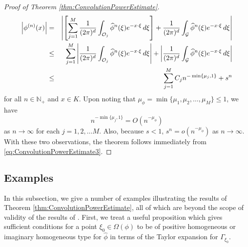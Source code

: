 \documentclass[11pt]{article}
\theoremstyle{remark}
\newcommand{\lb}{\left[}
\newcommand{\rb}{\right]}
\begin{document}
\begin{proof}[Proof of Theorem \ref{thm:ConvolutionPowerEstimate}]
\begin{eqnarray}\label{eq:ConvolutionPowerEstimate3}\nonumber
    \abs{\phi^{(n)}(x)}
    &=&\abs{\lb \sum_{j=1}^M\frac{1}{(2\pi)^d}\int_{\mathcal{O}_j}\widehat{\phi}^n(\xi)e^{-x\cdot\xi}\,d\xi \rb
    +\frac{1}{(2\pi)^d}\int_{\mathcal{G}}\widehat{\phi}^n(\xi)e^{-x\cdot\xi}\,d\xi}\\\nonumber
    &\leq&\sum_{j=1}^M\abs{\frac{1}{(2\pi)^d}\int_{\mathcal{O}_j}\widehat{\phi}^n(\xi)e^{-x\cdot\xi}\,d\xi}+\abs{\frac{1}{(2\pi)^d}\int_{\mathcal{G}}\widehat{\phi}^n(\xi)e^{-x\cdot\xi}\,d\xi}\\
    &\leq&\sum_{j=1}^M C_jn^{-\min\{\mu_j,1\}}+s^n
\end{eqnarray}
for all $n\in\mathbb{N}_+$ and $x\in K$. Upon noting that $\mu_\phi=\min\{\mu_1,\mu_2,\dots,\mu_M\}\leq 1$, we have
\begin{equation*}
    n^{-\min\{\mu_j,1\}}=O(n^{-\mu_\phi})
\end{equation*}
as $n\to\infty$ for each $j=1,2,\dots M$. Also, because $s<1$, $s^n=o(n^{-\mu_\phi})$ as $n\to \infty$. With these two observations, the theorem follows immediately from \eqref{eq:ConvolutionPowerEstimate3}.
\end{proof}


\subsection{Examples}\label{subsec:Examples}


In this subsection, we give a number of examples illustrating the results of Theorem \ref{thm:ConvolutionPowerEstimate}, all of which are beyond the scope of validity of the results of \cite{randles_convolution_2017}. First, we treat a useful proposition which gives sufficient conditions for a point $\xi_0\in\Omega(\phi)$ to be of positive homogeneous or imaginary homogeneous type for $\hat{\phi}$ in terms of the Taylor expansion for $\Gamma_{\xi_0}$.
\end{document}
